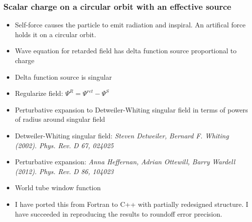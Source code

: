 \documentclass{beamer}
\begin{document}
\begin{frame}
  \frametitle{Scalar charge on a circular orbit with an effective source}
  \begin{itemize}
  \item Self-force causes the particle to emit radiation and inspiral. An artifical force holds it on a circular orbit.
  \item Wave equation for retarded field has delta function source proportional to charge
  \item Delta function source is singular
  \item Regularize field: $\Psi^R=\Psi^{ret}-\Psi^S$
  \item Perturbative expansion to Detweiler-Whiting singular field in terms of powers of radius around singular field
  \item Detweiler-Whiting singular field: {\em Steven Detweiler, Bernard F. Whiting (2002). Phys. Rev. D 67, 024025}
  \item Perturbative expansion: {\em Anna Heffernan, Adrian Ottewill, Barry Wardell (2012). Phys. Rev. D 86, 104023}
  \item World tube window function
  \item I have ported this from Fortran to C++ with partially redesigned structure. I have succeeded in reproducing the results to roundoff error precision.  
  \end{itemize}
\end{frame}
\end{document}
